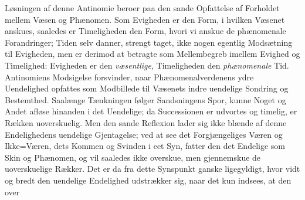 \documentclass[12pt]{book}
\newcommand{\opage}[1]{\marginnote{\footnotesize\textit{[#1]}}}
\begin{document}
Løsningen af denne Antinomie beroer paa den sande Opfattelse af Forholdet mellem
Væsen og Phænomen. Som Evigheden er den Form, i hvilken Væsenet anskues, saaledes er
Timeligheden den Form, hvori vi anskue de phænomenale Forandringer; Tiden selv
danner, strengt taget, ikke nogen egentlig Modsætning til Evigheden, men er derimod
at betragte som Mellembegreb imellem Evighed og Timelighed: Evigheden er den
\emph{væsentlige}, Timeligheden den \emph{phænomenale} Tid. Antinomiens Modsigelse
forsvinder, naar Phænomenalverdenens ydre Uendelighed opfattes som Modbillede til
Væsenets indre uendelige Sondring og Bestemthed. Saalænge Tænkningen følger
Sandsningens Spor, kunne Noget og Andet afløse hinanden i det Uendelige; da
Successionen er udvortes og timelig, er Rækken uoverskuelig. Men den sande Reflexion
lader sig ikke blænde af denne Endelighedens uendelige Gjentagelse; ved at see det
Forgjængeliges Væren og Ikke=Væren, dets Kommen og Svinden i eet Syn, fatter den det
Endelige som Skin og Phænomen, og vil saaledes ikke overskue, men gjennemskue de
uoverskuelige Rækker. Det er da fra dette Synspunkt ganske ligegyldigt, hvor vidt og
bredt den uendelige Endelighed udstrækker sig, naar det kun indsees, at den over%
\opage{124}%
%
%
%
\end{document}
